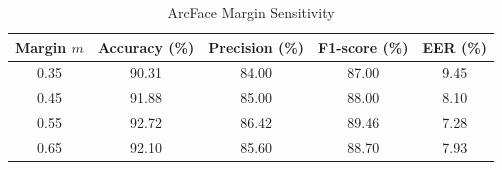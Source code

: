 \begin{table}[htbp]
\caption{ArcFace Margin Sensitivity}
\label{tab:margin_sensitivity}
\begin{center}
\begin{tabular}{|c|c|c|c|c|}
\hline
\textbf{Margin $m$} & \textbf{Accuracy (\%)} & \textbf{Precision (\%)} & \textbf{F1-score (\%)} & \textbf{EER (\%)} \\
\hline
0.35 & 90.31 & 84.00 & 87.00 & 9.45 \\
0.45 & 91.88 & 85.00 & 88.00 & 8.10 \\
0.55 & 92.72 & 86.42 & 89.46 & 7.28 \\
0.65 & 92.10 & 85.60 & 88.70 & 7.93 \\
\hline
\end{tabular}
\end{center}
\end{table}